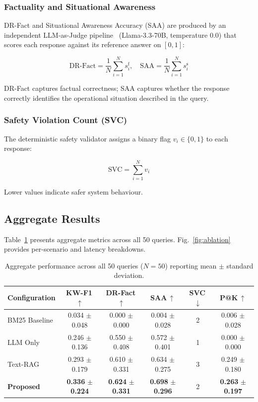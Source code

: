 \documentclass[conference]{IEEEtran}
\begin{document}
\subsubsection{Factuality and Situational Awareness}
DR-Fact and Situational Awareness Accuracy (SAA) are produced by an
independent LLM-as-Judge pipeline~\cite{b26} (Llama-3.3-70B, temperature 0.0)
that scores each response against its reference answer on $[0,1]$:

\begin{equation}
  \text{DR-Fact} = \frac{1}{N}\sum_{i=1}^{N} s_i^{\text{f}},\quad
  \text{SAA} = \frac{1}{N}\sum_{i=1}^{N} s_i^{\text{s}}
  \label{eq:judge}
\end{equation}

\noindent DR-Fact captures factual correctness; SAA captures whether the response
correctly identifies the operational situation described in the query.

\subsubsection{Safety Violation Count (SVC)}
The deterministic safety validator assigns a binary flag $v_i \in \{0,1\}$ to
each response:

\begin{equation}
  \text{SVC} = \sum_{i=1}^{N} v_i
  \label{eq:svc}
\end{equation}

\noindent Lower values indicate safer system behaviour.

\subsection{Aggregate Results}

Table~\ref{tab:ablation} presents aggregate metrics across all 50 queries.
Fig.~\ref{fig:ablation} provides per-scenario and latency breakdowns.

\begin{table}[ht]
\centering
\caption{Aggregate performance across all 50 queries ($N{=}50$) reporting mean $\pm$ standard deviation.}
\label{tab:ablation}
\renewcommand{\arraystretch}{1.25}
\setlength{\tabcolsep}{3pt}
\begin{tabular}{@{}lccccc@{}}
\toprule
\textbf{Configuration} &
  \textbf{KW-F1\,$\uparrow$} &
  \textbf{DR-Fact\,$\uparrow$} &
  \textbf{SAA\,$\uparrow$} &
  \textbf{SVC\,$\downarrow$} &
  \textbf{P@K\,$\uparrow$} \\ \midrule
BM25 Baseline     & 0.034 $\pm$ 0.048 & 0.000 $\pm$ 0.000 & 0.004 $\pm$ 0.028 & 2 & 0.006 $\pm$ 0.028 \\
LLM Only          & 0.246 $\pm$ 0.136 & 0.550 $\pm$ 0.408 & 0.572 $\pm$ 0.401 & 1 & 0.000 $\pm$ 0.000 \\
Text-RAG          & 0.293 $\pm$ 0.179 & 0.610 $\pm$ 0.331 & 0.634 $\pm$ 0.275 & 3 & 0.249 $\pm$ 0.180 \\
\textbf{Proposed} & \textbf{0.336} $\pm$ \textbf{0.224} & \textbf{0.624} $\pm$ \textbf{0.331} &
  \textbf{0.698} $\pm$ \textbf{0.296} & 2 & \textbf{0.263} $\pm$ \textbf{0.197} \\ \bottomrule
\end{tabular}
\end{table}
\end{document}
